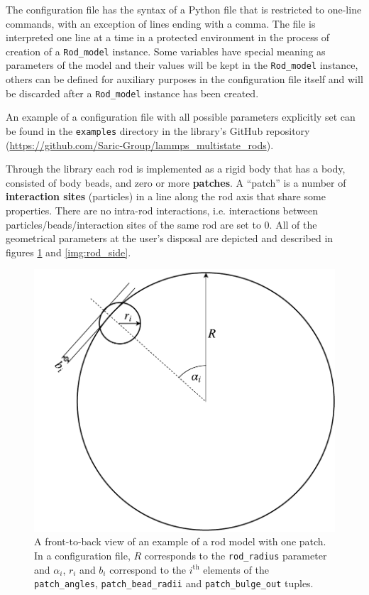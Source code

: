 \documentclass[a4paper]{article}
\begin{document}
\vspace{1em}

The configuration file has the syntax of a Python file that is restricted to one-line commands, with an
exception of lines ending with a comma. The file is interpreted one line at a time in a protected environment
in the process of creation of a \texttt{Rod\_model} instance.
Some variables have special meaning as parameters of the model and their values will be kept in the
\texttt{Rod\_model} instance, others can be defined for auxiliary purposes in the configuration file itself
and will be discarded after a \texttt{Rod\_model} instance has been created.

An example of a configuration file with all possible parameters explicitly set can be found in the
\texttt{examples} directory in the library's GitHub repository
(\href{https://github.com/Saric-Group/lammps_multistate_rods}{https://github.com/Saric-Group/lammps\_multistate\_rods}).

\vspace{1em}

Through the library each rod is implemented as a rigid body that has a body, consisted of body beads, and
zero or more \textbf{patches}. A ``patch'' is a number of \textbf{interaction sites} (particles) in a line
along the rod axis that share some properties. There are no intra-rod interactions, i.e. interactions between
particles/beads/interaction sites of the same rod are set to 0.
All of the geometrical parameters at the user's disposal are depicted and described in figures
\ref{img:rod_front} and \ref{img:rod_side}.

\begin{figure}[!h]
\centering
\includegraphics[width=0.38\linewidth]{rod_model-front_view.pdf}
\captionsetup{width=.7\linewidth}
\caption{A front-to-back view of an example of a rod model with one patch. In a configuration file, $R$
corresponds to the \texttt{rod\_radius} parameter and $\alpha_i$, $r_i$ and $b_i$ correspond to the
$i^\text{th}$ elements of the \texttt{patch\_angles}, \texttt{patch\_bead\_radii} and
\texttt{patch\_bulge\_out} tuples.}
\label{img:rod_front}
\end{figure}
\end{document}
